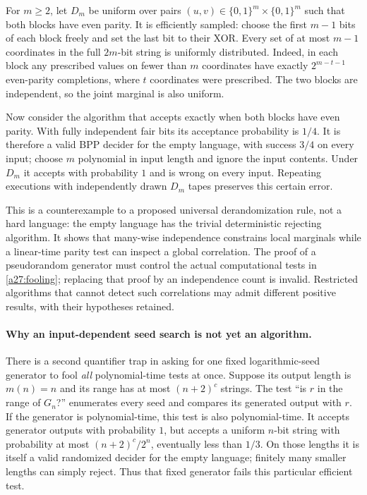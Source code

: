 \documentclass[11pt]{article}
\begin{document}
For $m\ge2$, let $D_m$ be uniform over pairs $(u,v)\in\{0,1\}^m\times
\{0,1\}^m$ such that both blocks have even parity. It is efficiently sampled:
choose the first $m-1$ bits of each block freely and set the last bit to
their XOR. Every set of at most $m-1$ coordinates in the full $2m$-bit string
is uniformly distributed. Indeed, in each block any prescribed values on
fewer than $m$ coordinates have exactly $2^{m-t-1}$ even-parity completions,
where $t$ coordinates were prescribed. The two blocks are independent,
so the joint marginal is also uniform.

Now consider the algorithm that accepts exactly when both blocks have even
parity. With fully independent fair bits its acceptance probability is
$1/4$. It is therefore a valid BPP decider for the empty language, with
success $3/4$ on every input; choose $m$ polynomial in input length and
ignore the input contents. Under $D_m$ it accepts with probability $1$ and
is wrong on every input. Repeating executions with independently drawn
$D_m$ tapes preserves this certain error.

This is a counterexample to a proposed universal derandomization rule,
not a hard language: the empty language has the trivial deterministic
rejecting algorithm. It shows that many-wise independence constrains local
marginals while a linear-time parity test can inspect a global correlation.
The proof of a pseudorandom generator must control the actual computational
tests in \eqref{a27:fooling}; replacing that proof by an independence count
is invalid. Restricted algorithms that cannot detect such correlations may
admit different positive results, with their hypotheses retained.

\paragraph{Why an input-dependent seed search is not yet an algorithm.}
There is a second quantifier trap in asking for one fixed logarithmic-seed
generator to fool \emph{all} polynomial-time tests at once. Suppose its
output length is $m(n)=n$ and its range has at most $(n+2)^c$ strings.
The test ``is $r$ in the range of $G_n$?'' enumerates every seed and compares
its generated output with $r$. If the generator is polynomial-time, this
test is also polynomial-time. It accepts generator outputs with probability
$1$, but accepts a uniform $n$-bit string with probability at most
$(n+2)^c/2^n$, eventually less than $1/3$. On those lengths it is itself a
valid randomized decider for the empty language; finitely many smaller
lengths can simply reject. Thus that fixed generator fails this particular
efficient test.
\end{document}
